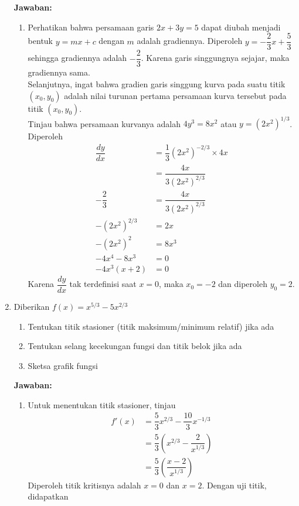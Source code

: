 \documentclass{article}
\begin{document}
\begin{enumerate}
	\textbf{Jawaban:}
	\begin{enumerate}
		\item Perhatikan bahwa persamaan garis $2x+3y=5$ dapat diubah menjadi bentuk $y=mx+c$ dengan $m$ adalah gradiennya. Diperoleh $y=-\dfrac{2}{3}x+\dfrac{5}{3}$ sehingga gradiennya adalah $-\dfrac{2}{3}$. Karena garis singgungnya sejajar, maka gradiennya sama. \\
		Selanjutnya, ingat bahwa gradien garis singgung kurva pada suatu titik $(x_0,y_0)$ adalah nilai turunan pertama persamaan kurva tersebut pada titik $(x_0,y_0)$.\\
		Tinjau bahwa persamaan kurvanya adalah $4y^3=8x^2$ atau $y=(2x^2)^{1/3}$. Diperoleh 
		\begin{align*}
		\dfrac{dy}{dx} &= \dfrac{1}{3}(2x^2)^{-2/3}\times 4x\\
		&= \dfrac{4x}{3(2x^2)^{2/3}}\\
		-\dfrac{2}{3} &= \dfrac{4x}{3(2x^2)^{2/3}}\\
		-(2x^2)^{2/3} &= 2x\\
		-(2x^2)^2 &= 8x^3\\
		-4x^4 -8x^3 &= 0\\
		-4x^3(x+2) &= 0
		\end{align*}
		Karena $\dfrac{dy}{dx}$ tak terdefinisi saat $x=0$, maka $x_0=-2$ dan diperoleh $y_0=2$.
	\end{enumerate}
	\item Diberikan $f(x)=x^{5/3}-5x^{2/3}$
	\begin{enumerate}
		\item Tentukan titik stasioner (titik maksimum/minimum relatif) jika ada
		\item Tentukan selang kecekungan fungsi dan titik belok jika ada
		\item Sketsa grafik fungsi
	\end{enumerate}
	\textbf{Jawaban:}
	\begin{enumerate}
		\item Untuk menentukan titik stasioner, tinjau 
		\begin{align*}
		f'(x) &= 	\dfrac{5}{3}x^{2/3} -\dfrac{10}{3}x^{-1/3} \\
		&= \dfrac{5}{3}\left(x^{2/3} -\dfrac{2}{x^{1/3}}\right) \\
		&= \dfrac{5}{3}\left(\dfrac{x-2}{x^{1/3}}\right) 
		\end{align*}
		Diperoleh titik kritisnya adalah $x=0$ dan $x=2$. Dengan uji titik, didapatkan 
		\begin{center}
		\begin{tikzpicture}

\end{tikzpicture}
\end{center}
\end{enumerate}
\end{enumerate}
\end{document}
